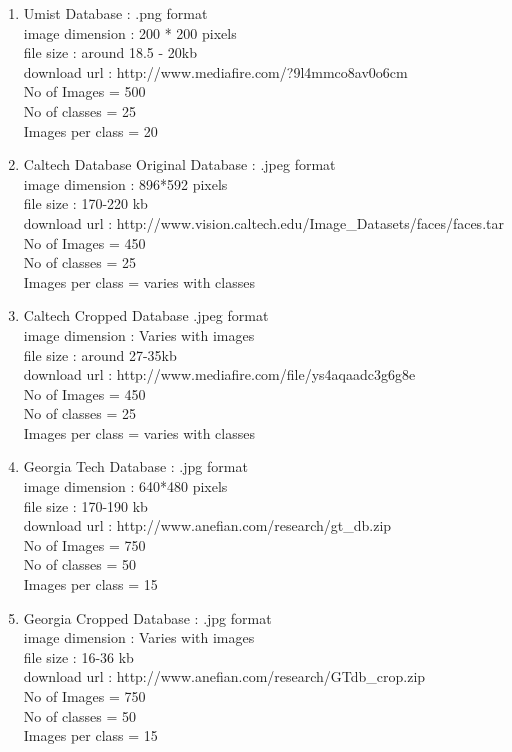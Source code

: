 \documentclass[10pt,a4paper]{article}
\begin{document}
\begin{enumerate}
\item Umist Database : .png format \\
   image dimension : 200 * 200 pixels \\
   file size : around 18.5 - 20kb \\
   download url : http://www.mediafire.com/?9l4mmco8av0o6cm \\
   No of Images = 500 \\
   No of classes = 25 \\
   Images per class = 20 \\ 

\item Caltech Database Original Database : .jpeg format \\
   image dimension : 896*592 pixels \\
   file size : 170-220 kb \\
   download url : http://www.vision.caltech.edu/Image\_Datasets/faces/faces.tar  \\
   No of Images = 450 \\
   No of classes = 25 \\
   Images per class = varies with classes \\

\item Caltech Cropped Database .jpeg format\\
   image dimension :  Varies with images \\
   file size : around 27-35kb \\
   download url : http://www.mediafire.com/file/ys4aqaadc3g6g8e \\
   No of Images = 450 \\
   No of classes = 25 \\
   Images per class = varies with classes \\

\item Georgia Tech Database : .jpg format \\
   image dimension :  640*480 pixels\\
   file size :  170-190 kb\\ 
   download url : http://www.anefian.com/research/gt\_db.zip \\
   No of Images =  750\\
   No of classes =  50\\
   Images per class = 15 \\ 

\item Georgia Cropped Database : .jpg format \\
   image dimension :  Varies with images \\
   file size : 16-36 kb\\
   download url : http://www.anefian.com/research/GTdb\_crop.zip \\
   No of Images = 750\\
   No of classes = 50 \\
   Images per class = 15\\


\end{enumerate}
\end{document}
